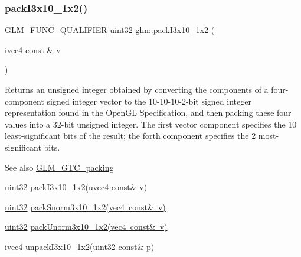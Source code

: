 \subsubsection{\texorpdfstring{pack\+I3x10\+\_\+1x2()}{packI3x10\_1x2()}}
{\footnotesize\ttfamily \mbox{\hyperlink{setup_8hpp_a33fdea6f91c5f834105f7415e2a64407}{G\+L\+M\+\_\+\+F\+U\+N\+C\+\_\+\+Q\+U\+A\+L\+I\+F\+I\+ER}} \mbox{\hyperlink{group__gtc__type__precision_ga202b6a53c105fcb7e531f9b443518451}{uint32}} glm\+::pack\+I3x10\+\_\+1x2 (\begin{DoxyParamCaption}\item[{\mbox{\hyperlink{group__core__types_gaa4560ddc50320ea8f8a70d5c9c249fea}{ivec4}} const \&}]{v }\end{DoxyParamCaption})}

Returns an unsigned integer obtained by converting the components of a four-\/component signed integer vector to the 10-\/10-\/10-\/2-\/bit signed integer representation found in the Open\+GL Specification, and then packing these four values into a 32-\/bit unsigned integer. The first vector component specifies the 10 least-\/significant bits of the result; the forth component specifies the 2 most-\/significant bits.

\begin{DoxySeeAlso}{See also}
\mbox{\hyperlink{group__gtc__packing}{G\+L\+M\+\_\+\+G\+T\+C\+\_\+packing}} 

\mbox{\hyperlink{group__gtc__type__precision_ga202b6a53c105fcb7e531f9b443518451}{uint32}} pack\+I3x10\+\_\+1x2(uvec4 const\& v) 

\mbox{\hyperlink{group__gtc__type__precision_ga202b6a53c105fcb7e531f9b443518451}{uint32}} \mbox{\hyperlink{group__gtc__packing_ga0d4157cec37c0312216a7be1cc92df54}{pack\+Snorm3x10\+\_\+1x2(vec4 const\& v)}} 

\mbox{\hyperlink{group__gtc__type__precision_ga202b6a53c105fcb7e531f9b443518451}{uint32}} \mbox{\hyperlink{group__gtc__packing_ga2cf2d11b40bd48639110456fd74c2e33}{pack\+Unorm3x10\+\_\+1x2(vec4 const\& v)}} 

\mbox{\hyperlink{group__core__types_gaa4560ddc50320ea8f8a70d5c9c249fea}{ivec4}} unpack\+I3x10\+\_\+1x2(uint32 const\& p) 
\end{DoxySeeAlso}
\mbox{\label{group__gtc__packing_ga0182984c14b2b59fd74e72af3f3b4bb9}} 
